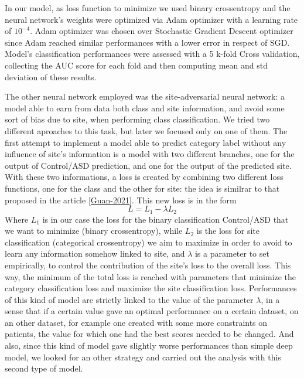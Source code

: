 \documentclass[10pt]{report}
\begin{document}
In our model, as loss function to minimize we used binary crossentropy and the neural network's weights were optimized via Adam optimizer with a learning rate of $10^{-4}$.
Adam optimizer was chosen over Stochastic Gradient Descent optimizer since Adam reached similar performances with a lower error in respect of SGD.
Model's classification performances were assessed with a 5 k-fold Cross validation, collecting the AUC score for each fold and then computing mean and std deviation of these results.


The other neural network employed was the site-adversarial neural network: a model able to earn from data both class and site information, and avoid some sort of bias due to site, when performing class classification.
We tried two different aproaches to this task, but later we focused only on one of them.
The first attempt to implement a model able to predict category label without any influence of site's information is a model with two different branches, one for the output of Control/ASD prediction, and one for the output of the predicted site.
With these two informations, a loss is created by combining two different loss functions, one for the class and the other for site: the idea is similrar to that proposed in the article \ref{Guan-2021}.
This new loss is in the form
\begin{equation}
L = L_1 - \lambda L_2
\end{equation}
Where $L_1$  is in our case the loss for the binary classification Control/ASD that we want to minimize (binary crossentropy), while $L_2$ is the loss for site classification (categorical crossentropy) we aim to maximize in order to avoid to learn any information somehow linked to site, and $\lambda $ is a parameter to set empirically, to control the contribution of the site's loss to the overall loss.
This way, the minimum of the total loss is reached with parameters that minimize the category classification loss and maximize the site classification loss.
Performances of this kind of model are strictly linked to the value of the parameter $\lambda$, in a sense that if a certain value gave an optimal performance on a certain dataset, on an other dataset, for example one created with some more constraints on patients, the value for which one had the best scores needed to be changed.
And also, since this kind of model gave slightly worse performances than simple deep model, we looked for an other strategy and carried out the analysis with this second type of model.
\end{document}
